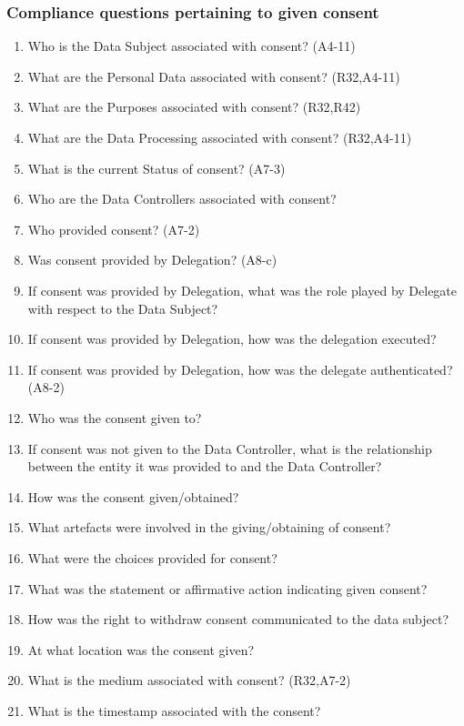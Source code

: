 \subsubsection{Compliance questions pertaining to given consent}
\begin{enumerate}[label={\textit{CMQ.\theenumi}},resume]
    \item Who is the Data Subject associated with consent? (A4-11)
    \item What are the Personal Data associated with consent? (R32,A4-11)
    \item What are the Purposes associated with consent? (R32,R42)
    \item What are the Data Processing associated with consent? (R32,A4-11)
    \item What is the current Status of consent? (A7-3)
    \item Who are the Data Controllers associated with consent?
    \item Who provided consent? (A7-2)
    \item Was consent provided by Delegation? (A8-c)
    \item If consent was provided by Delegation, what was the role played by Delegate with respect to the Data Subject?
    \item If consent was provided by Delegation, how was the delegation executed?
    \item If consent was provided by Delegation, how was the delegate authenticated? (A8-2)
    \item Who was the consent given to?
    \item If consent was not given to the Data Controller, what is the relationship between the entity it was provided to and the Data Controller?
    \item How was the consent given/obtained?
    \item What artefacts were involved in the giving/obtaining of consent?
    \item What were the choices provided for consent?
    \item What was the statement or affirmative action indicating given consent?
    \item How was the right to withdraw consent communicated to the data subject?
    \item At what location was the consent given?
    \item What is the medium associated with consent? (R32,A7-2)
    \item What is the timestamp associated with the consent?

\end{enumerate}
